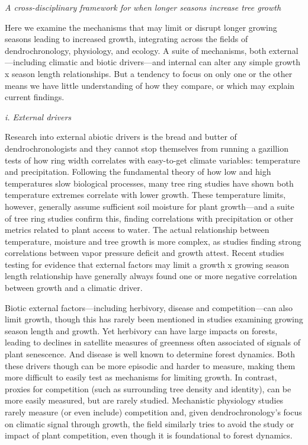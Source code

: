 \documentclass[11pt]{article}
\begin{document}
\emph{A cross-disciplinary framework for when longer seasons increase tree growth}

Here we examine the mechanisms that may limit or disrupt longer growing seasons leading to increased growth, integrating across the fields of dendrochronology, physiology, and ecology. A suite of mechanisms, both external---including climatic and biotic drivers---and internal can alter any simple growth x season length relationships. But a tendency to focus on only one or the other means we have little understanding of how they compare, or which may explain current findings. 

\emph{i. External drivers}

Research into external abiotic drivers is the bread and butter of dendrochronologists and they cannot stop themselves from running a gazillion tests of how ring width correlates with easy-to-get climate variables: temperature and precipitation. Following the fundamental theory of how low and high temperatures slow biological processes, many tree ring studies have shown both temperature extremes correlate with lower growth. These temperature limits, however, generally assume sufficient soil moisture for plant growth---and a suite of tree ring studies confirm this, finding correlations with precipitation or other metrics related to plant access to water. The actual relationship between temperature, moisture and tree growth is more complex, as studies finding strong correlations between vapor pressure deficit and growth attest. Recent studies testing for evidence that external factors may limit a growth x growing season length relationship have generally always found one or more negative correlation between growth and a climatic driver. 

Biotic external factors---including herbivory, disease and competition---can also limit growth, though this has rarely been mentioned in studies examining growing season length and growth. Yet herbivory can have large impacts on forests, leading to declines in satellite measures of greenness often associated of signals of plant senescence. And disease is well known to determine forest dynamics. Both these drivers though can be more episodic and harder to measure, making them more difficult to easily test as mechanisms for limiting growth. In contrast, proxies for competition (such as surrounding tree density and identity), can be more easily measured, but are rarely studied. Mechanistic physiology studies rarely measure (or even include) competition and, given dendrochronology's focus on climatic signal through growth, the field similarly tries to avoid the study or impact of plant competition, even though it is foundational to forest dynamics. 
\end{document}
